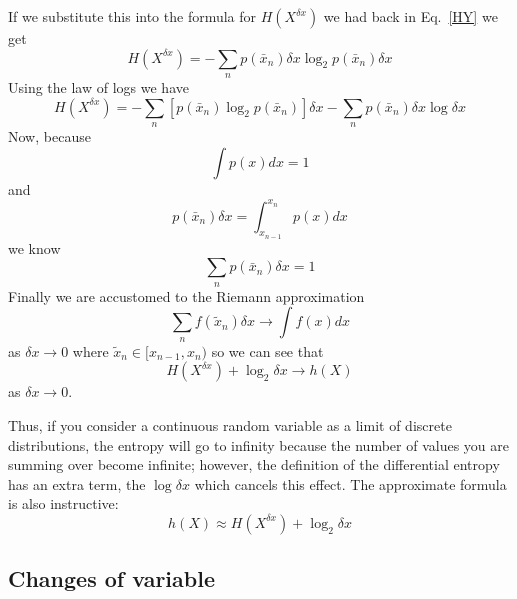 \documentclass[12pt]{article}
\begin{document}
If we substitute this into the formula for $H(X^{\delta x})$ we had back in Eq.~\ref{HY} we get 
\begin{equation}
  H(X^{\delta x})=-\sum_n p(\bar{x}_n)\delta x \log_2{p(\bar{x}_n)\delta x}
\end{equation}
Using the law of logs we have
\begin{equation}
  H(X^{\delta x})=-\sum_n \left[p(\bar{x}_n) \log_2{p(\bar{x}_n)}\right] \delta x -\sum_np(\bar{x}_n)\delta x \log{\delta x}
\end{equation}
Now, because
\begin{equation}
  \int p(x)dx=1
\end{equation}
and 
\begin{equation}
  p(\bar{x}_n)\delta x=\int_{x_{n-1}}^{x_n}p(x)dx
\end{equation}
we know
\begin{equation}
  \sum_np(\bar{x}_n)\delta x=1     
\end{equation}
Finally we are accustomed to the Riemann approximation
\begin{equation}
  \sum_n f(\tilde{x}_n) \delta x\rightarrow \int f(x)dx 
\end{equation}
as $\delta x\rightarrow 0$ where $\tilde{x}_n\in [x_{n-1},x_n)$ so we can see that
    \begin{equation}
      H(X^{\delta x})+\log_2{\delta x}\rightarrow h(X)
    \end{equation}
    as $\delta x\rightarrow 0$.

Thus, if you consider a continuous random variable as a limit of
discrete distributions, the entropy will go to infinity because the
number of values you are summing over become infinite; however, the
definition of the differential entropy has an extra term, the
$\log{\delta x}$ which cancels this effect. The approximate formula is also instructive:
\begin{equation}
  h(X)\approx H(X^{\delta x}) +\log_2{\delta x}
\end{equation}

\subsection*{Changes of variable}
\end{document}
